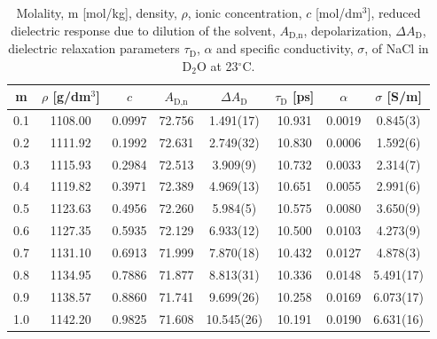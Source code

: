 \begin{table}[!ht]
	\centering
	\caption{Molality, m [mol/kg], density, $\rho$, ionic concentration, $c$ [mol/dm$^3$], reduced dielectric response due to dilution of the solvent, $A_\text{D,n}$, depolarization, $\Delta A_\text{D}$, dielectric relaxation parameters $\tau_\text{D}$, $\alpha$ and specific conductivity, $\sigma$, of NaCl in D$_2$O at 23$^\circ$C.}
	\label{my-label2}
	\begin{tabular}{cccccccc}
		\hline
		m & $\rho$ [g/dm$^3$] & $c$   & $A_\text{D,n}$ & $\Delta A_\text{D}$ & $\tau_\text{D}$ [ps] & $\alpha$ & $\sigma$ [S/m] \\
		\hline
		0.1 & 1108.00 & 0.0997 & 72.756 & 1.491(17)  & 10.931 & 0.0019 & 0.845(3)  \\
		0.2 & 1111.92 & 0.1992 & 72.631 & 2.749(32)  & 10.830  & 0.0006 & 1.592(6)  \\
		0.3 & 1115.93 & 0.2984 & 72.513 & 3.909(9)   & 10.732 & 0.0033 & 2.314(7)  \\
		0.4 & 1119.82 & 0.3971 & 72.389 & 4.969(13)  & 10.651 & 0.0055 & 2.991(6)  \\
		0.5 & 1123.63 & 0.4956 & 72.260 & 5.984(5)   & 10.575 & 0.0080 & 3.650(9) \\
		0.6 & 1127.35 & 0.5935 & 72.129 & 6.933(12)  & 10.500 & 0.0103 & 4.273(9) \\
		0.7 & 1131.10 & 0.6913 & 71.999 & 7.870(18)  & 10.432 & 0.0127 & 4.878(3)  \\
		0.8 & 1134.95 & 0.7886 & 71.877 & 8.813(31)  & 10.336 & 0.0148 & 5.491(17) \\
		0.9 & 1138.57 & 0.8860 & 71.741 & 9.699(26)  & 10.258 & 0.0169 & 6.073(17) \\
		1.0 & 1142.20 & 0.9825 & 71.608 & 10.545(26) & 10.191 & 0.0190 & 6.631(16) \\
		\hline
	\end{tabular}
\end{table}



